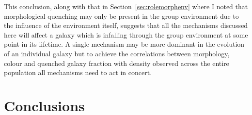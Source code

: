 This conclusion, along with that in Section~\ref{sec:rolemorphenv} where I noted that morphological quenching may only be present in the group environment due to the influence of the environment itself, suggests that all the mechanisms discussed here will affect a galaxy which is infalling through the group environment at some point in its lifetime. A single mechanism may be more dominant in the evolution of an individual galaxy but to achieve the correlations between morphology, colour and quenched galaxy fraction with density observed across the entire population all mechanisms need to act in concert.  

\section{Conclusions}\label{sec:conc}

